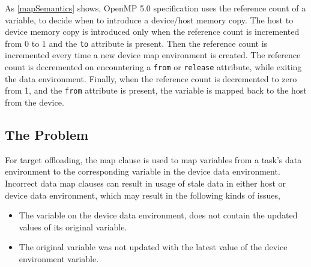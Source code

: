 As \autoref{mapSemantics} shows, OpenMP 5.0 specification uses the reference count of a variable, to decide when to introduce 
a device/host memory copy. The host to device memory copy is 
introduced only when the reference count is incremented from 0 to 1 and the \texttt{to} attribute is present. 
Then the reference count is incremented every time a 
new device map environment is created. 
The reference count is decremented on encountering a \texttt{from} or \texttt{release} 
attribute, while exiting the data environment. 
Finally, when the reference count is decremented to zero from 1, and the 
\texttt{from} attribute is present, 
the variable is mapped back to the host from the device.
\subsection{The Problem}
For target offloading, the map clause is used to map variables from a 
task's data environment to the corresponding variable in the device 
data environment. Incorrect data map clauses can result in 
usage of 
stale data in either host or device data environment, 
which may result in the following kinds of issues, 
\begin{itemize}
 \item The variable on the device data environment, does not contain 
 the updated values of its original variable.
 \item The original variable was not updated with the latest value of 
 the device environment variable.
\end{itemize}
